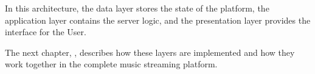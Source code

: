 In this architecture, the data layer stores the state of the platform,
the application layer contains the server logic, and the presentation
layer provides the interface for the User.

The next chapter, , describes how these
layers are implemented and how they work together in the complete music
streaming platform.